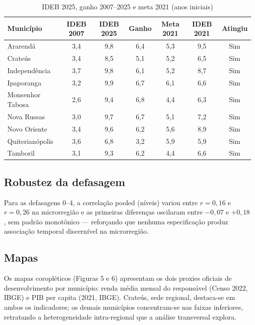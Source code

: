 \documentclass[12pt,a4paper]{article}
\begin{document}
\begin{table}[h!]
\centering
\caption{IDEB 2025, ganho 2007--2025 e meta 2021 (anos iniciais)}
\small
\begin{tabular}{lcccccc}
\toprule
\textbf{Município} & \textbf{IDEB 2007} & \textbf{IDEB 2025} & \textbf{Ganho} & \textbf{Meta 2021} & \textbf{IDEB 2021} & \textbf{Atingiu} \\
\midrule
Ararendá & 3,4 & 9,8 & 6,4 & 5,3 & 9,5 & Sim \\
Crateús & 3,4 & 8,5 & 5,1 & 5,2 & 6,5 & Sim \\
Independência & 3,7 & 9,8 & 6,1 & 5,2 & 8,7 & Sim \\
Ipaporanga & 3,2 & 9,9 & 6,7 & 6,1 & 6,6 & Sim \\
Monsenhor Tabosa & 2,6 & 9,4 & 6,8 & 4,4 & 6,3 & Sim \\
Nova Russas & 3,0 & 9,7 & 6,7 & 5,1 & 7,2 & Sim \\
Novo Oriente & 3,4 & 9,6 & 6,2 & 5,6 & 8,9 & Sim \\
Quiterianópolis & 3,6 & 6,8 & 3,2 & 5,9 & 5,9 & Sim \\
Tamboril & 3,1 & 9,3 & 6,2 & 4,4 & 6,6 & Sim \\
\bottomrule
\end{tabular}
\end{table}

\subsection{Robustez da defasagem}

Para as defasagens 0--4, a correlação pooled (níveis) variou entre $r = 0{,}16$ e $r = 0{,}26$ na microrregião e as primeiras diferenças oscilaram entre $-0{,}07$ e $+0{,}18$, sem padrão monotônico --- reforçando que nenhuma especificação produz associação temporal discernível na microrregião.

\subsection{Mapas}

Os mapas coropléticos (Figuras 5 e 6) apresentam os dois proxies oficiais de desenvolvimento por município: renda média mensal do responsável (Censo 2022, IBGE) e PIB per capita (2021, IBGE). Crateús, sede regional, destaca-se em ambos os indicadores; os demais municípios concentram-se nas faixas inferiores, retratando a heterogeneidade intra-regional que a análise transversal explora.
\end{document}
